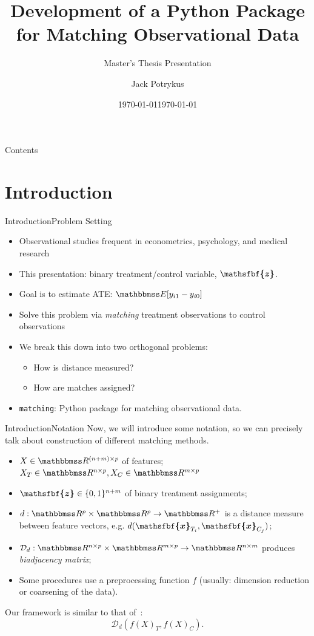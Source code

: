 \documentclass[11pt, compress]{beamer}
\title{}
\date{\today}
\title{Development of a Python Package for Matching Observational Data}
\subtitle{Master's Thesis Presentation}
\author{Jack Potrykus}
\date{\today}
\institute{University of Chicago Department of Statistics}
\newcommand{\reals}{\ensuremath{\mathbbmss R}}
\renewcommand{\vec}[1]{\ensuremath{\boldsymbol{\mathsfbf{#1}}}}
\newcommand{\mat}[1]{\ensuremath{#1}}
\begin{document}
\maketitle

\begin{frame}{Contents}
	\tableofcontents
\end{frame}


\section{Introduction}
\begin{frame}{Introduction}{Problem Setting}
	\begin{itemize}
		\item Observational studies frequent in econometrics, psychology, and medical research
		\item This presentation: binary treatment/control variable, $\vec{z}$.
		\item Goal is to estimate ATE: $\mathbbmss E [y_{i1} - y_{i0}]$
		\item Solve this problem via \emph{matching} treatment observations to control observations
		\item We break this down into two orthogonal problems:
			\begin{itemize}
				\item How is distance measured?
				\item How are matches assigned?
			\end{itemize}
		\item \texttt{matching}: Python package for matching observational data.
	\end{itemize}
\end{frame}

\begin{frame}{Introduction}{Notation}
	Now, we will introduce some notation, so we can precisely talk about construction of different matching methods.
	\begin{itemize}
		\item $\mat{X} \in \reals^{(n + m) \times p}$ of features; $\mat{X}_T \in \reals^{n \times p}, \mat{X}_C \in \reals^{m \times p}$
		\item $\vec{z} \in \{0, 1\}^{n + m}$ of binary treatment assignments;
		\item $d: \reals^p \times \reals^p \to \reals^+$ is a distance measure between feature vectors, e.g. $d(\vec{x}_{T_{i}}, \vec{x}_{C_{j}})$;
		\item $\mathcal{D}_d : \reals^{n \times p} \times \reals^{m \times p} \to \reals^{n \times m}$ produces \emph{biadjacency matrix};
		\item Some procedures use a preprocessing function $f$ (usually: dimension reduction or coarsening of the data).
	\end{itemize}
	Our framework is similar to that of~\textcite{iacus_multivariate_2011}:
	\begin{equation}
		\mathcal{D}_d(f(\mat{X})_T, f(\mat{X})_C). \label{eqn:beamerabstractdistance}
	\end{equation}
\end{frame}
\end{document}
